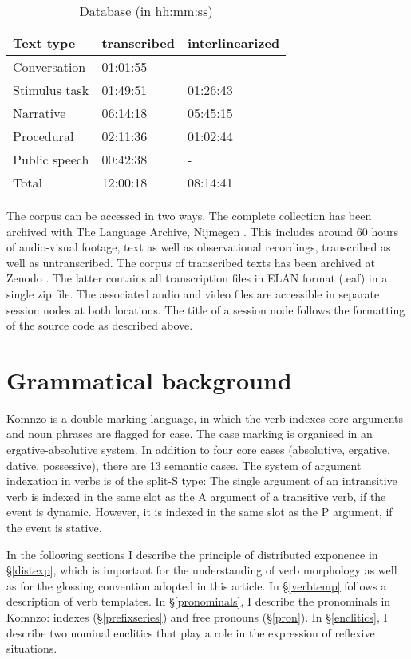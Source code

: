 \documentclass[output=paper]{langscibook}
\begin{document}
\begin{table}
	\centering
	\caption{Database (in hh:mm:ss)}
	\begin{tabular}{lll}
		\hline
		Text type&transcribed&interlinearized\\
		\hline
		Conversation&01:01:55&-\\
		Stimulus task&01:49:51&01:26:43\\
		Narrative&06:14:18&05:45:15\\
		Procedural&02:11:36&01:02:44\\
		Public speech&00:42:38&-\\
		\hline
		Total&12:00:18&08:14:41\\
		\hline
	\end{tabular}
	\label{table1}
\end{table}

The corpus can be accessed in two ways. The complete collection has been archived with The Language Archive, Nijmegen \citep{Doehler2010}. This includes around 60 hours of audio-visual footage, text as well as observational recordings, transcribed as well as untranscribed. The corpus of transcribed texts has been archived at Zenodo \citep{Doehler2020}. The latter contains all transcription files in ELAN format (.eaf) in a single zip file. The associated audio and video files are accessible in separate session nodes at both locations. The title of a session node follows the formatting of the source code as described above.
\section{Grammatical background}\label{grambackground}
Komnzo is a double-marking language, in which the verb indexes core arguments and noun phrases are flagged for case. The case marking is organised in an ergative-absolutive system. In addition to four core cases (absolutive, ergative, dative, possessive), there are 13 semantic cases. The system of argument indexation in verbs is of the split-S type: The single argument of an intransitive verb is indexed in the same slot as the A argument of a transitive verb, if the event is dynamic. However, it is indexed in the same slot as the P argument, if the event is stative.

In the following sections I describe the principle of distributed exponence in \S\ref{distexp}, which is important for the understanding of verb morphology as well as for the glossing convention adopted in this article. In \S\ref{verbtemp} follows a description of verb templates. In \S\ref{pronominals}, I describe the pronominals in Komnzo: indexes (\S\ref{prefixseries}) and free pronouns (\S\ref{pron}). In \S\ref{enclitics}, I describe two nominal enclitics that play a role in the expression of reflexive situations.
\end{document}
